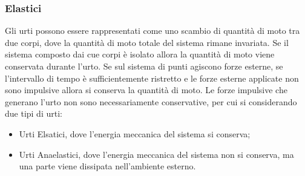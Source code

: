\documentclass{article}
\numberwithin{equation}{subsection}
\begin{document}
\begin{center}\end{center}

\subsubsection{Elastici}
Gli urti possono essere rappresentati come uno scambio di quantità di moto tra due corpi, dove la quantità di moto totale del sistema rimane invariata. 
Se il sistema composto dai cue corpi è isolato allora la quantità di 
moto viene conservata durante l'urto. Se sul sistema di punti agiscono forze esterne, se l'intervallo di tempo è sufficientemente ristretto e le forze esterne applicate 
non sono impulsive allora si conserva la quantità di moto. Le forze impulsive che generano l'urto non sono necessariamente conservative, per cui si considerando 
due tipi di urti: 
\begin{itemize}
    \item Urti Elsatici, dove l'energia meccanica del sistema si conserva;
    \item Urti Anaelastici, dove l'energia meccanica del sistema non si conserva, ma una parte viene dissipata nell'ambiente esterno.
\end{itemize}
\end{document}
